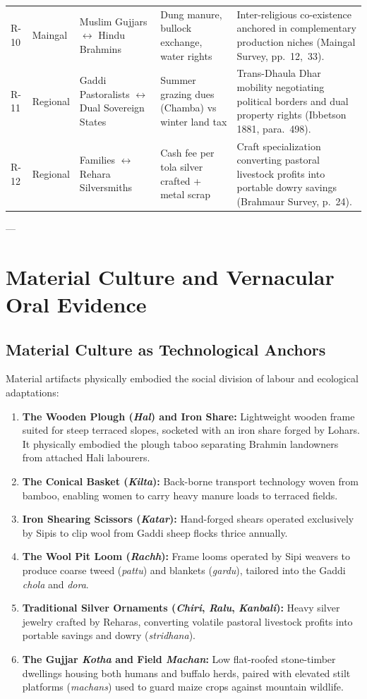 \documentclass[11pt,a4paper]{article}
\begin{document}
\begin{table}[H]
\begin{tabularx}{\textwidth}{llp{3cm}p{3.5cm}X}
R-10 & Maingal & Muslim Gujjars $\leftrightarrow$ Hindu Brahmins & Dung manure, bullock exchange, water rights & Inter-religious co-existence anchored in complementary production niches (Maingal Survey, pp.~12,~33). \\
R-11 & Regional & Gaddi Pastoralists $\leftrightarrow$ Dual Sovereign States & Summer grazing dues (Chamba) vs winter land tax & Trans-Dhaula Dhar mobility negotiating political borders and dual property rights (Ibbetson 1881, para.~498). \\
R-12 & Regional & Families $\leftrightarrow$ Rehara Silversmiths & Cash fee per tola silver crafted + metal scrap & Craft specialization converting pastoral livestock profits into portable dowry savings (Brahmaur Survey, p.~24). \\
\bottomrule
\end{tabularx}
\end{table}

---

\section{Material Culture and Vernacular Oral Evidence}

\subsection{Material Culture as Technological Anchors}
Material artifacts physically embodied the social division of labour and ecological adaptations:
\begin{enumerate}[leftmargin=*]
    \item \textbf{The Wooden Plough (\textit{Hal}) and Iron Share:} Lightweight wooden frame suited for steep terraced slopes, socketed with an iron share forged by Lohars. It physically embodied the plough taboo separating Brahmin landowners from attached Hali labourers.
    \item \textbf{The Conical Basket (\textit{Kilta}):} Back-borne transport technology woven from bamboo, enabling women to carry heavy manure loads to terraced fields.
    \item \textbf{Iron Shearing Scissors (\textit{Katar}):} Hand-forged shears operated exclusively by Sipis to clip wool from Gaddi sheep flocks thrice annually.
    \item \textbf{The Wool Pit Loom (\textit{Rachh}):} Frame looms operated by Sipi weavers to produce coarse tweed (\textit{pattu}) and blankets (\textit{gardu}), tailored into the Gaddi \textit{chola} and \textit{dora}.
    \item \textbf{Traditional Silver Ornaments (\textit{Chiri}, \textit{Ralu}, \textit{Kanbali}):} Heavy silver jewelry crafted by Reharas, converting volatile pastoral livestock profits into portable savings and dowry (\textit{stridhana}).
    \item \textbf{The Gujjar \textit{Kotha} and Field \textit{Machan}:} Low flat-roofed stone-timber dwellings housing both humans and buffalo herds, paired with elevated stilt platforms (\textit{machans}) used to guard maize crops against mountain wildlife.
\end{enumerate}
\end{document}
